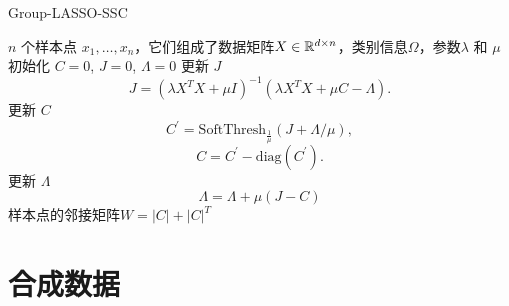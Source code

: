 \documentclass[main.tex]{subfiles}
\begin{document}
\begin{algorithm}[tb]
  \caption{Group-LASSO-SSC}
  \label{alg:MatrixSSC}
  \begin{algorithmic}
    $n$ 个样本点 $x_1,\ldots,x_n$，它们组成了数据矩阵$X\in \mathbb{R}^{d\times n}$，类别信息$\Omega$，参数$\lambda$ 和 $\mu$
    \State 初始化 $C=0$, $J=0$, $\Lambda=0$
     更新 $J$ 
    $$J=(\lambda X^TX+\mu I)^{-1}(\lambda X^TX+\mu C-\Lambda).$$
     更新 $C$
    $$ C^{'}=\mathrm{SoftThresh}_{\frac{1}{\mu}}\left(J+\Lambda/\mu\right), $$
    $$ C=C^{'}-\mathrm{diag}(C^{'}).$$
     更新 $\Lambda$
    $$\Lambda=\Lambda+\mu(J-C)$$
    \EndWhile
     样本点的邻接矩阵$W=|C|+|C|^T$
  \end{algorithmic}
\end{algorithm}

\section{合成数据}
\end{document}
